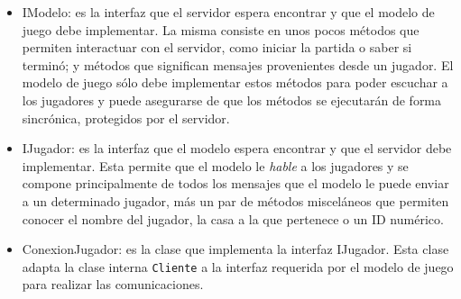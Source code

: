 \documentclass[titlepage,a4paper,12pt]{article}
\begin{document}
\begin{itemize}
\item IModelo: es la interfaz que el servidor espera encontrar y que el modelo de juego debe implementar. La misma consiste en unos pocos métodos que permiten interactuar con el servidor, como iniciar la partida o saber si terminó; y métodos que significan mensajes provenientes desde un jugador. El modelo de juego sólo debe implementar estos métodos para poder escuchar a los jugadores y puede asegurarse de que los métodos se ejecutarán de forma sincrónica, protegidos por el servidor.

\item IJugador: es la interfaz que el modelo espera encontrar y que el servidor debe implementar. Esta permite que el modelo le \textit{hable} a los jugadores y se compone principalmente de todos los mensajes que el modelo le puede enviar a un determinado jugador, más un par de métodos misceláneos que permiten conocer el nombre del jugador, la casa a la que pertenece o un ID numérico.

\item ConexionJugador: es la clase que implementa la interfaz IJugador. Esta clase adapta la clase interna \texttt{Cliente} a la interfaz requerida por el modelo de juego para realizar las comunicaciones.

\end{itemize}
\end{document}
